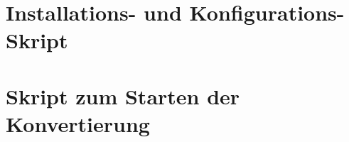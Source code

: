 \newpage
\section{Installations- und Konfigurations-Skript} \label{configureScript}


\newpage
 \section{Skript zum Starten der Konvertierung} \label{startingConvertScript}
 
